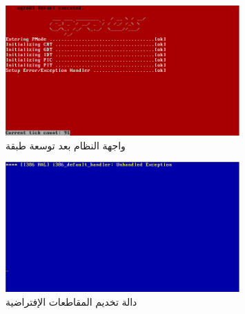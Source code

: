 \documentclass[document.tex]{subfiles}
\begin{document}
\begin{figure}[h!]
  \label{fig:irq} 
  \caption{واجهة النظام بعد توسعة طبقة }
  \centering
   \includegraphics[width=0.8\textwidth]{../img/irq}
\end{figure}


\begin{figure}[h!]
  \label{fig:default_irq} 
  \caption{دالة تخديم المقاطعات الإفتراضية}
  \centering
   \includegraphics[width=0.8\textwidth]{../img/default_irq}
\end{figure}
\end{document}
